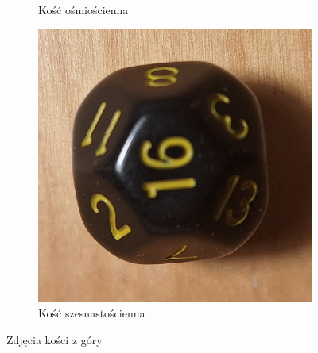 \begin{figure}[h]
\begin{subfigure}{.3\textwidth}
        \caption{\label{fig:k8}Kość ośmiościenna}
      \end{subfigure}%
       \begin{subfigure}{.3\textwidth}
        \includegraphics[width=.9\textwidth, angle=-90, clip]{chapters/01-wstep/figures/k16}
        \caption{\label{fig:k16}Kość szesnastościenna}
      \end{subfigure}
    \caption{Zdjęcia kości z góry}
\end{figure}

